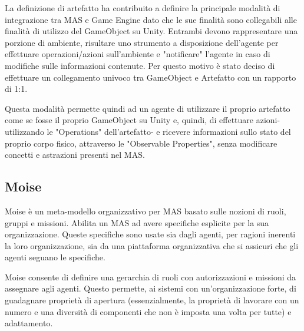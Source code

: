 La definizione di artefatto ha contribuito a definire la principale modalità di integrazione tra MAS e Game Engine dato che le sue finalità sono collegabili alle finalità di utilizzo del GameObject su Unity. Entrambi devono rappresentare una porzione di ambiente, risultare uno strumento a disposizione dell'agente per effettuare operazioni/azioni sull'ambiente e "notificare" l'agente in caso di modifiche sulle informazioni contenute. Per questo motivo è stato deciso di effettuare un collegamento univoco tra GameObject e Artefatto con un rapporto di 1:1.

\medskip 

Questa modalità permette quindi ad un agente di utilizzare il proprio artefatto come se fosse il proprio GameObject su Unity e, quindi, di effettuare azioni- utilizzando le "Operations" dell'artefatto- e ricevere informazioni sullo stato del proprio corpo fisico, attraverso le "Observable Properties", senza modificare concetti e astrazioni presenti nel MAS. 

\subsection{Moise}
Moise è un meta-modello organizzativo per MAS basato sulle nozioni di ruoli, gruppi e missioni. Abilita un MAS ad avere specifiche esplicite per la sua organizzazione. Queste specifiche sono usate sia dagli agenti, per ragioni inerenti la loro organizzazione, sia da una piattaforma organizzativa che si assicuri che gli agenti seguano le specifiche.

\medskip

Moise consente di definire una gerarchia di ruoli con autorizzazioni e missioni da assegnare agli agenti. Questo permette, ai sistemi con un'organizzazione forte, di guadagnare proprietà di apertura (essenzialmente, la proprietà di lavorare con un numero e una diversità di componenti che non è imposta una volta per tutte) e adattamento.
